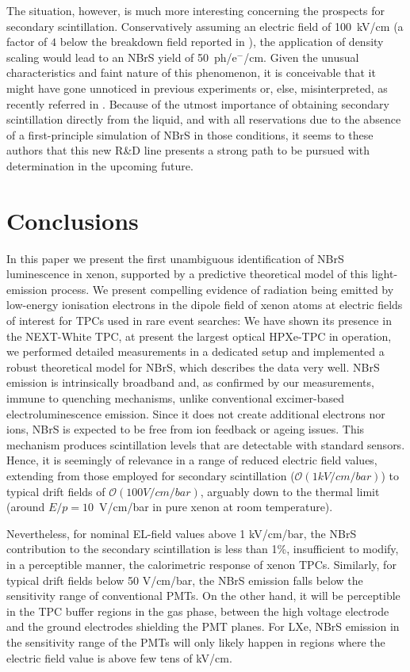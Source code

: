 \documentclass[%
 reprint,
superscriptaddress,
 amsmath,amssymb,
 aps,
]{revtex4-2}
\begin{document}
The situation, however, is much more interesting concerning the prospects for secondary scintillation. Conservatively assuming an electric field of 100~kV/cm (a factor of $4$ below the breakdown field reported in \cite{EB}), the application of density scaling would lead to an NBrS yield of 50~ph/e$^{-}$/cm. Given the unusual characteristics and faint nature of this phenomenon, it is conceivable that it might have gone unnoticed in previous experiments or, else, misinterpreted, as recently referred in \cite{nBrLast}. Because of the utmost importance of obtaining secondary scintillation directly from the liquid, and with all reservations due to the absence of a first-principle simulation of NBrS in those conditions, it seems to these authors that this new R\&D line presents a strong path to be pursued with determination in the upcoming future. 

\section{\label{sec:conclusions}Conclusions}

In this paper we present the first unambiguous identification of NBrS luminescence in xenon, supported by a predictive theoretical model of this light-emission process.
We present compelling evidence of radiation being emitted by low-energy ionisation electrons in the dipole field of xenon atoms at electric fields of interest for TPCs used in rare event searches: We have shown its presence in the NEXT-White TPC, at present the largest optical HPXe-TPC in operation, we performed detailed measurements in a dedicated setup and implemented a robust theoretical model for NBrS, which describes the data very well. NBrS emission is intrinsically broadband and, as confirmed by our measurements, immune to quenching mechanisms, unlike conventional excimer-based electroluminescence emission. Since it does not create additional electrons nor ions, NBrS is expected to be free from ion feedback or ageing issues. This mechanism produces scintillation levels that are detectable with standard sensors. Hence, it is seemingly of relevance in a range of reduced electric field values, extending from those employed for secondary scintillation ($\mathcal{O}(1 {kV/cm/bar})$) to typical drift fields of $\mathcal{O}(100 {V/cm/bar})$, arguably down to the thermal limit (around $E/p=10$~V/cm/bar in pure xenon at room temperature). 

Nevertheless, for nominal EL-field values above 1 kV/cm/bar, the NBrS contribution to the secondary scintillation is less than 1\%,  insufficient to modify, in a perceptible manner, the calorimetric response of xenon TPCs. 
Similarly, for typical drift fields below 50 V/cm/bar, the NBrS emission falls below the sensitivity range of conventional PMTs. On the other hand, it will be perceptible in the TPC buffer regions in the gas phase, between the high voltage electrode and the ground electrodes shielding the PMT planes. For LXe, NBrS emission in the sensitivity range of the PMTs will only likely happen in regions where the electric field value is above few tens of kV/cm.
\end{document}
